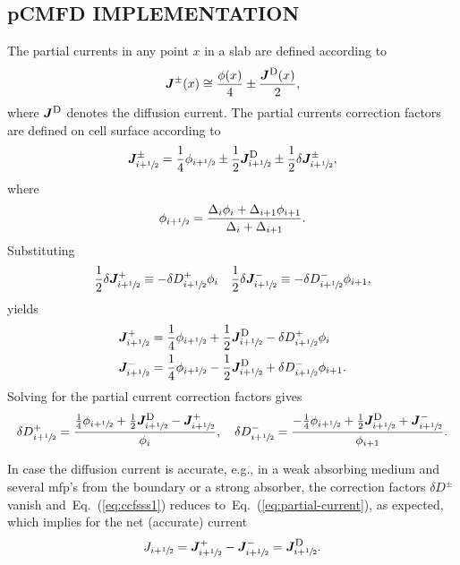 \documentclass[letterpaper]{physor2020}
\newcommand{\eq}[1]{Eq.~(\ref{#1})}
\newcommand{\jp}{\ensuremath{\bm{J}^+}}
\newcommand{\jm}{\ensuremath{\bm{J}^-}}
\newcommand{\jpm}{\ensuremath{\bm{J}^\pm}}
\newcommand{\jD}{\ensuremath{\bm{J}^{\textrm{\scriptsize{D}}}}}
\newcommand{\hzi}{\ensuremath{\sfrac{1}{2}}}
\newcommand{\jp}{\ensuremath{J^+}}
\newcommand{\jm}{\ensuremath{J^-}}
\newcommand{\jpm}{\ensuremath{J^\pm}}
\newcommand{\jD}{\ensuremath{J^{\textrm{\scriptsize{D}}}}}
\newcommand{\hzi}{\ensuremath{\sfrac{1}{2}}}
\begin{document}
\subsection{pCMFD IMPLEMENTATION}
\label{sec:RM-pCMFD}

The partial currents in any point $x$ in a slab are defined according to
\begin{equation}
\label{eq:partial-current}
\jpm(x) \cong \frac{\phi(x)}{4} \pm \frac{\jD (x)}{2},
\end{equation}
where $\jD$ denotes the diffusion current.
The partial currents correction factors are defined on cell surface according to
\begin{equation}
\label{eq:PCCF}
\jpm _{i+\hzi} = \frac{1}{4}\phi_{i+\hzi}
\pm \frac{1}{2} \jD _{i+\hzi} \pm \frac{1}{2} \delta \jpm _{i+\hzi},
\end{equation}
where
\begin{equation}
\label{eq:jdiff}
\phi_{i+\hzi} = \frac{\Delta_i \phi_i + \Delta_{i+1} \phi_{i+1}}{\Delta_i + \Delta_{i+1}}.
\end{equation}
Substituting~\cite{Jarrett-2016,Zhu-2016}
\begin{equation}
\label{eq:CCF-sub}
\frac{1}{2} \delta \jp _{i+\hzi} \equiv -\delta D^+ _{i+\hzi} \phi_i
\quad
\frac{1}{2} \delta \jm _{i+\hzi} \equiv -\delta D^- _{i+\hzi} \phi_{i+1},
\end{equation}
yields
\begin{align}
\label{eq:par4}
\jp _{i+\hzi} &= \frac{1}{4}\phi_{i+\hzi}
+ \frac{1}{2}\jD _{i+\hzi} - \delta D^+ _{i+\hzi} \phi_i \\
\jm _{i+\hzi} &= \frac{1}{4}\phi_{i+\hzi}
- \frac{1}{2}\jD _{i+\hzi} + \delta D^- _{i+\hzi} \phi_{i+1}.
\end{align}
%
Solving for the partial current correction factors gives
\begin{equation}
\label{eq:ccfsss1}
\delta D^+ _{i+\hzi} = \frac{\frac{1}{4}\phi_{i+\hzi}
	+ \frac{1}{2}\jD _{i+\hzi} - \jp _{i+\hzi}}{\phi_i}, \quad
\delta D^- _{i+\hzi} = \frac{-\frac{1}{4}\phi_{i+\hzi}
	+ \frac{1}{2}\jD _{i+\hzi} + \jm _{i+\hzi}}{\phi_{i+1}}.
\end{equation}

In case the diffusion current is accurate, e.g., in a weak absorbing medium and several mfp's from the boundary or a strong absorber, the correction factors $\delta D^\pm$ vanish and~\eq{eq:ccfsss1} reduces to~\eq{eq:partial-current}, as expected, which implies for the net (accurate) current
\begin{equation}
J _{i+\hzi} = \jp _{i+\hzi} - \jm _{i+\hzi} = \jD _{i+\hzi}.
\end{equation}
\end{document}
